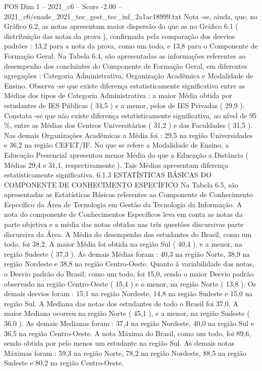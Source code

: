 \begin{textsample}{POS Dim 1 – 2021\_c6 – Score -2.00 – 2021\_c6/enade\_2021\_tec\_gest\_tec\_inf\_2a1ac18999.txt}
Nota -se, ainda, que, no Gráfico 6.2, as notas apresentam maior dispersão do que as no Gráfico 6.1 ( distribuição das notas da prova ), confirmada pela comparação dos desvios padrões : 13,2 para a nota da prova, como um todo, e 13,8 para o Componente de Formação Geral.
Na Tabela 6.4, são apresentadas as informações referentes ao desempenho dos concluintes do Componente de Formação Geral, em diferentes agregações : Categoria Administrativa, Organização Acadêmica e Modalidade de Ensino.
Observa -se que existe diferença estatisticamente significativa entre as Médias dos tipos de Categoria Administrativa : a maior Média obtida por estudantes de IES Públicas ( 34,5 ) e a menor, pelos de IES Privadas ( 29,9 ).
Constata -se que não existe diferença estatisticamente significativa, ao nível de 95 \%, entre as Médias dos Centros Universitários ( 31,2 ) e das Faculdades ( 31,5 ).
Nas demais Organizações Acadêmicas a Média foi : 29,5 na região Universidades e 36,2 na região CEFET/IF.
No que se refere a Modalidade de Ensino, a Educação Presencial apresentou menor Média do que a Educação a Distância ( Médias 29,4 e 31,1, respectivamente ).
Tais Médias apresentam diferença estatisticamente significativa. 6.1.3 ESTATÍSTICAS BÁSICAS DO COMPONENTE DE CONHECIMENTO ESPECÍFICO Na Tabela 6.5, são apresentadas as Estatísticas Básicas referentes ao Componente de Conhecimento Específico da Área de Tecnologia em Gestão da Tecnologia da Informação.
A nota do componente de Conhecimentos Específicos leva em conta as notas da parte objetiva e a média das notas obtidas nas três questões discursivas parte discursiva da Área.
A Média do desempenho dos estudantes do Brasil, como um todo, foi 38,2.
A maior Média foi obtida na região Sul ( 40,4 ), e a menor, na região Sudeste ( 37,3 ).
As demais Médias foram : 40,3 na região Norte, 38,9 na região Nordeste e 38,8 na região Centro-Oeste.
Quanto à variabilidade das notas, o Desvio padrão do Brasil, como um todo, foi 15,0, sendo o maior Desvio padrão observado na região Centro-Oeste ( 15,4 ) e o menor, na região Norte ( 13,8 ).
Os demais desvios foram : 15,1 na região Nordeste, 14,8 na região Sudeste e 15,0 na região Sul.
A Mediana das notas dos estudantes de todo o Brasil foi 37,0.
A maior Mediana ocorreu na região Norte ( 45,1 ), e a menor, na região Sudeste ( 36,0 ).
As demais Medianas foram : 37,4 na região Nordeste, 40,0 na região Sul e 36,5 na região Centro-Oeste.
A nota Máxima do Brasil, como um todo, foi 89,6, sendo obtida por pelo menos um estudante na região Sul.
As demais notas Máximas foram : 59,3 na região Norte, 78,2 na região Nordeste, 88,5 na região Sudeste e 80,2 na região Centro-Oeste.

\end{textsample}
